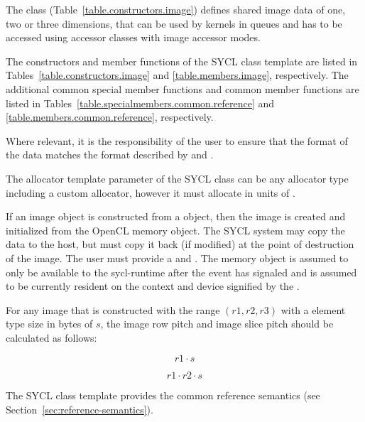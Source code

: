 The class 
(Table~\ref{table.constructors.image}) defines shared image data of one,
two or three dimensions, that can be used by kernels in queues and has to
be accessed using \gls{accessor} classes with image accessor modes.

The constructors and member functions of the SYCL  class template are listed in Tables~\ref{table.constructors.image} and \ref{table.members.image}, respectively. The additional common special member functions and common member functions are listed in Tables~\ref{table.specialmembers.common.reference} and \ref{table.members.common.reference}, respectively.

Where relevant, it is the
responsibility of the user to ensure that the format of the data
matches the format described by
 and .

The allocator template parameter of the SYCL  class can be any allocator type including a custom allocator, however it must allocate in units of .

If an image object is constructed from a  object,
then the image is created and initialized from the OpenCL memory
object. The SYCL system may copy the data to the host, but must copy
it back (if modified) at the point of destruction of the image.
The user must provide a  and
. The memory object is assumed to only be available to the
\gls{sycl-runtime} after the event has signaled and is assumed to be
currently resident on the context and device signified by the
.

For any image that is constructed with the range $(r1, r2, r3)$ with a element
type size in bytes of $s$, the image row pitch and image slice pitch should be
calculated as follows:

\begin{equation}
\label{image-row-pitch}
 r1 \cdot s
\end{equation}

\begin{equation}
\label{image-slice-pitch}
 r1 \cdot r2 \cdot s
\end{equation}

The SYCL  class template provides the common reference
semantics (see Section~\ref{sec:reference-semantics}).

